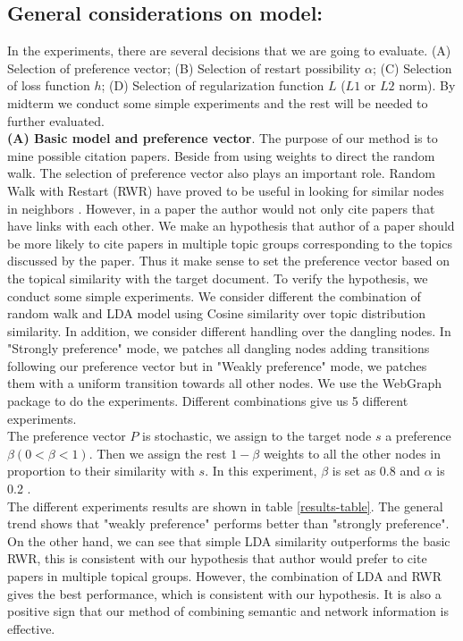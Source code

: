 \documentclass{article} %
\begin{document}
\subsection{General considerations on model:} 
In the experiments, there are several decisions that we are going to evaluate. (A) Selection of preference vector; (B) Selection of restart possibility $\alpha$; (C) Selection of loss function $h$;  (D) Selection of regularization function $L$ ($L1$ or $L2$ norm). By midterm we conduct some simple experiments and the rest will be needed to further evaluated.\\
\textbf{(A) Basic model and preference vector}. 
The purpose of our method is to mine possible citation papers. Beside from using weights to direct the random walk. The selection of preference vector also plays an important role. Random Walk with Restart (RWR) have proved to be useful in looking for similar nodes in neighbors  \cite{Backstrom:2011:SRW:1935826.1935914,Tong2006}. However, in a paper the author would not only cite papers that have links with each other. We make an hypothesis that author of a paper should be more likely to cite papers in multiple topic groups corresponding to the topics discussed by the paper. Thus it make sense to set the preference vector based on the topical similarity with the target document. To verify the hypothesis, we conduct some simple experiments. We consider different the combination of random walk and LDA model using Cosine similarity over topic distribution similarity. In addition, we consider different handling over the dangling nodes. In "Strongly preference" mode, we patches all dangling nodes adding transitions following our preference vector but in "Weakly preference" mode, we patches them with a uniform transition towards all other nodes. We use the WebGraph\cite{Boldi2004} package to do the experiments. Different combinations give us 5 different experiments.\\
The preference vector $P$ is stochastic, we assign to the target node $s$ a preference $\beta (0< \beta <1)$. Then we assign the rest $1-\beta$ weights to all the other nodes in proportion to their similarity with $s$. In this experiment, $\beta$ is set as 0.8 and $\alpha$ is 0.2 .\\
The different experiments results are shown in table \ref{results-table}. The general trend shows that "weakly preference" performs better than "strongly preference". On the other hand, we can see that simple LDA similarity outperforms the basic RWR, this is consistent with our hypothesis that author would prefer to cite papers in multiple topical groups. However, the combination of LDA and RWR gives the best performance, which is consistent with our hypothesis. It is also a positive sign that our method of combining semantic and network information is effective.  
\end{document}
